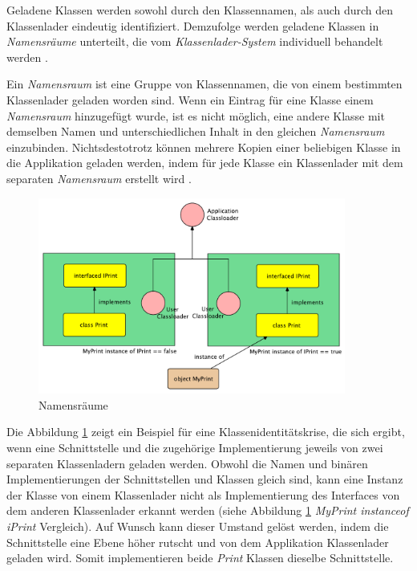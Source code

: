     Geladene Klassen werden sowohl durch den Klassennamen, als auch durch den Klassenlader eindeutig identifiziert. Demzufolge werden geladene Klassen in \textit{Namensräume} unterteilt, die vom \textit{Klassenlader-System} individuell behandelt werden \cite{namespaces}. 

    Ein \textit{Namensraum} ist eine Gruppe von Klassennamen, die von einem bestimmten Klassenlader geladen worden sind. Wenn ein Eintrag für eine Klasse einem \textit{Namensraum} hinzugefügt wurde, ist es nicht möglich, eine andere Klasse mit demselben Namen und unterschiedlichen Inhalt in den gleichen \textit{Namensraum} einzubinden. Nichtsdestotrotz können mehrere Kopien einer beliebigen Klasse in die Applikation geladen werden, indem für jede Klasse ein Klassenlader mit dem separaten \textit{Namensraum} erstellt wird \cite{customClDiffSpace}. 

    \begin{figure}[h]
      \centering
      \includegraphics[width=0.9\textwidth]{material/images/namespace.pdf}
      \caption{Namensräume \cite{customClDiffSpace}}
      \label{fig:nam}
    \end{figure}

    Die Abbildung \ref{fig:nam} zeigt ein Beispiel für eine Klassenidentitätskrise, die sich ergibt, wenn eine Schnittstelle und die zugehörige Implementierung jeweils von zwei separaten Klassenladern geladen werden. Obwohl die Namen und binären Implementierungen der Schnittstellen und Klassen gleich sind, kann eine Instanz der Klasse von einem Klassenlader nicht als Implementierung des Interfaces von dem anderen Klassenlader erkannt werden (siehe Abbildung \ref{fig:nam} \textit{MyPrint instanceof iPrint} Vergleich). Auf Wunsch kann dieser Umstand gelöst werden, indem die  Schnittstelle eine Ebene höher rutscht und von dem Applikation Klassenlader geladen wird. Somit implementieren beide \textit{Print} Klassen dieselbe Schnittstelle.\bigbreak 


